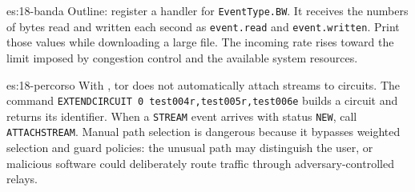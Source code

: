 \begin{soluzione}{es:18-banda}
Outline: register a handler for \texttt{EventType.BW}. It receives the numbers of bytes read and written each second as \texttt{event.read} and \texttt{event.written}. Print those values while downloading a large file. The incoming rate rises toward the limit imposed by congestion control and the available system resources.
\end{soluzione}

\begin{soluzione}{es:18-percorso}
With , tor does not automatically attach streams to circuits. The command \texttt{EXTENDCIRCUIT 0 test004r,test005r,test006e} builds a circuit and returns its identifier. When a \texttt{STREAM} event arrives with status \texttt{NEW}, call \texttt{ATTACHSTREAM}. Manual path selection is dangerous because it bypasses weighted selection and guard policies: the unusual path may distinguish the user, or malicious software could deliberately route traffic through adversary-controlled relays.
\end{soluzione}
